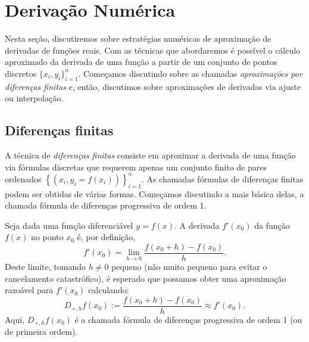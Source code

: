 
%

\chapter{Derivação Numérica}

Nesta seção, discutiremos sobre estratégias numéricas de aproximação de derivadas de funções reais. Com as técnicas que abordaremos é possível o cálculo aproximado da derivada de uma função a partir de um conjunto de pontos discretos $\{x_i, y_i\}_{i=1}^n$. Começamos discutindo sobre as chamadas \emph{aproximações por diferenças finitas} e, então, discutimos sobre aproximações de derivadas via ajuste ou interpolação.

\section{Diferenças finitas}

A técnica de \emph{diferenças finitas} consiste em aproximar a derivada de uma função via fórmulas discretas que requerem apenas um conjunto finito de pares ordenados $\left\{\left(x_i, y_i=f(x_i)\right)\right\}_{i=1}^n$. As chamadas fórmulas de diferenças finitas podem ser obtidas de várias formas. Começamos discutindo a mais básica delas, a chamada fórmula de diferenças progressiva de ordem 1.

Seja dada uma função diferenciável $y = f(x)$. A derivada $f'(x_0)$ da função $f(x)$ no ponto $x_0$ é, por definição,
\begin{equation*}
  f'(x_0)=\lim_{h\to 0}\frac{f(x_0+h)-f(x_0)}{h}.
\end{equation*}
Deste limite, tomando $h\neq 0$ pequeno (não muito pequeno para evitar o cancelamento catastrófico), é esperado que possamos obter uma aproximação razoável para $f'(x_0)$ calculando:
\begin{equation}\label{eq:dp}
  D_{+,h}f(x_0) := \frac{f(x_0+h)-f(x_0)}{h} \approx f'(x_0).
\end{equation}
Aqui, $D_{+,h}f(x_0)$ é a chamada fórmula de diferenças progressiva de ordem 1 (ou de primeira ordem).

